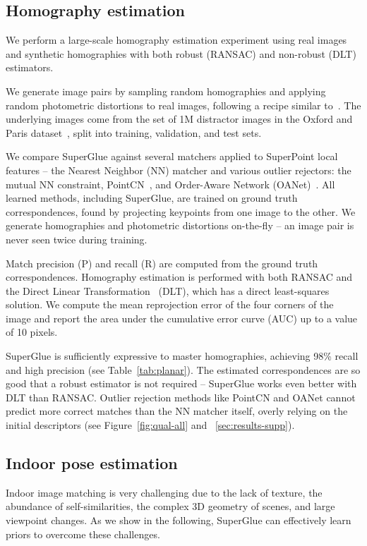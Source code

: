\documentclass[10pt,twocolumn,letterpaper]{article}
\newcommand{\PAR}[1]{\vskip4pt \noindent{\bf #1~}}
\renewcommand{\*}[1]{\mathbf{#1}}
\newcommand{\0}{\phantom{0}}
\begin{document}
\subsection{Homography estimation}
\label{sec:homography}
We perform a large-scale homography estimation experiment using real images and synthetic homographies with both robust (RANSAC) and non-robust (DLT) estimators.

\PAR{Dataset:} We generate image pairs by sampling random homographies and applying random photometric distortions to real images, following a recipe similar to~\cite{detone2016deep, superpoint, revaud2019r2d2, ranftl2018deep}. The underlying images come from the set of 1M distractor images in the Oxford and Paris dataset~\cite{radenovic2018revisiting}, split into training, validation, and test sets.

\PAR{Baselines:}  We compare SuperGlue against several matchers applied to SuperPoint local features -- the Nearest Neighbor (NN) matcher and various outlier rejectors: the mutual NN constraint, PointCN~\cite{moo2018learning}, and Order-Aware Network (OANet)~\cite{zhang2019learning}. All learned methods, including SuperGlue, are trained on ground truth correspondences, found by projecting keypoints from one image to the other. We generate homographies and photometric distortions on-the-fly -- an image pair is never seen twice during training.

\PAR{Metrics:} Match precision (P) and recall (R) are computed from the ground truth correspondences. Homography estimation is performed with both RANSAC and the Direct Linear Transformation~\cite{hartley2003multiple} (DLT), which has a direct least-squares solution. We compute the mean reprojection error of the four corners of the image and report the area under the cumulative error curve (AUC) up to a value of 10 pixels.

\PAR{Results:} SuperGlue is sufficiently expressive to master homographies, achieving 98\% recall and high precision (see Table~\ref{tab:planar}). The estimated correspondences are so good that a robust estimator is not required -- SuperGlue works even better with DLT than RANSAC. Outlier rejection methods like PointCN and OANet cannot predict more correct matches than the NN matcher itself, overly relying on the initial descriptors (see Figure~\ref{fig:qual-all} and \supp~\ref{sec:results-supp}).

\subsection{Indoor pose estimation}
\label{sec:indoor}
Indoor image matching is very challenging due to the lack of texture, the abundance of self-similarities, the complex 3D geometry of scenes, and large viewpoint changes. As we show in the following, SuperGlue can effectively learn priors to overcome these challenges.
\end{document}
